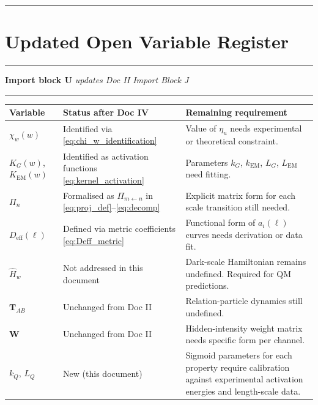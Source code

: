 \documentclass[11pt, a4paper, oneside]{article}
\theoremstyle{definition}
\theoremstyle{plain}
\theoremstyle{remark}
\newcommand{\Proj}[2]{\Pi_{#1 \leftarrow #2}}
\begin{document}
\noindent\rule{\linewidth}{0.4pt}

\section{Updated Open Variable Register}
\label{sec:open_vars}

\noindent\rule{\linewidth}{0.8pt}
\textbf{Import block U} \hfill
  \textit{updates Doc II Import Block J}
\noindent\rule{\linewidth}{0.4pt}

\begin{center}
\begin{tabularx}{\linewidth}{l l X}
  \toprule
  Variable & Status after Doc IV & Remaining requirement \\
  \midrule
  $\chi_w(w)$ &
  Identified via \eqref{eq:chi_w_identification} &
  Value of $\eta_u$ needs experimental or theoretical constraint. \\[4pt]

  $K_G(w)$, $K_\mathrm{EM}(w)$ &
  Identified as activation functions \eqref{eq:kernel_activation} &
  Parameters $k_G$, $k_\mathrm{EM}$, $L_G$, $L_\mathrm{EM}$ need fitting. \\[4pt]

  $\Pi_n$ &
  Formalised as $\Proj{m}{n}$ in \eqref{eq:proj_def}--\eqref{eq:decomp} &
  Explicit matrix form for each scale transition still needed. \\[4pt]

  $D_\mathrm{eff}(\ell)$ &
  Defined via metric coefficients \eqref{eq:Deff_metric} &
  Functional form of $a_i(\ell)$ curves needs derivation or data fit. \\[4pt]

  $\hat{H}_w$ &
  Not addressed in this document &
  Dark-scale Hamiltonian remains undefined. Required for QM predictions. \\[4pt]

  $\mathbf{T}_{AB}$ &
  Unchanged from Doc II &
  Relation-particle dynamics still undefined. \\[4pt]

  $\mathbf{W}$ &
  Unchanged from Doc II &
  Hidden-intensity weight matrix needs specific form per channel. \\[4pt]

  $k_Q$, $L_Q$ &
  New (this document) &
  Sigmoid parameters for each property require calibration against
  experimental activation energies and length-scale data. \\
  \bottomrule
\end{tabularx}
\end{center}
\end{document}
